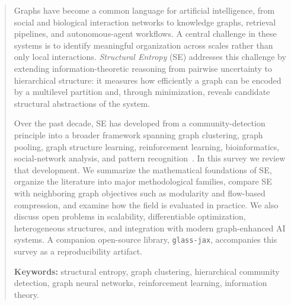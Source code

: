 \begin{abstract}
Graphs have become a common language for artificial intelligence, from social
and biological interaction networks to knowledge graphs, retrieval pipelines,
and autonomous-agent workflows.
A central challenge in these systems is to identify meaningful organization
across scales rather than only local interactions.
\emph{Structural Entropy} (SE) addresses this challenge by extending
information-theoretic reasoning from pairwise uncertainty to hierarchical
structure: it measures how efficiently a graph can be encoded by a multilevel
partition and, through minimization, reveals candidate structural abstractions
of the system.

Over the past decade, SE has developed from a community-detection principle
into a broader framework spanning graph clustering, graph pooling, graph
structure learning, reinforcement learning, bioinformatics, social-network
analysis, and pattern recognition~\cite{Li2016,wu2022pooling,zeng2025sidmJMLR,zhang2021supertad,peng2024zjyun,zhu2023HiTIN}.
In this survey we review that development.
We summarize the mathematical foundations of SE, organize the literature into
major methodological families, compare SE with neighboring graph objectives
such as modularity and flow-based compression, and examine how the field is
evaluated in practice.
We also discuss open problems in scalability, differentiable optimization,
heterogeneous structures, and integration with modern graph-enhanced AI
systems.
A companion open-source library, \texttt{glass-jax}, accompanies this survey
as a reproducibility artifact.

\medskip\noindent\textbf{Keywords:} structural entropy, graph clustering,
hierarchical community detection, graph neural networks, reinforcement learning,
information theory.
\end{abstract}
